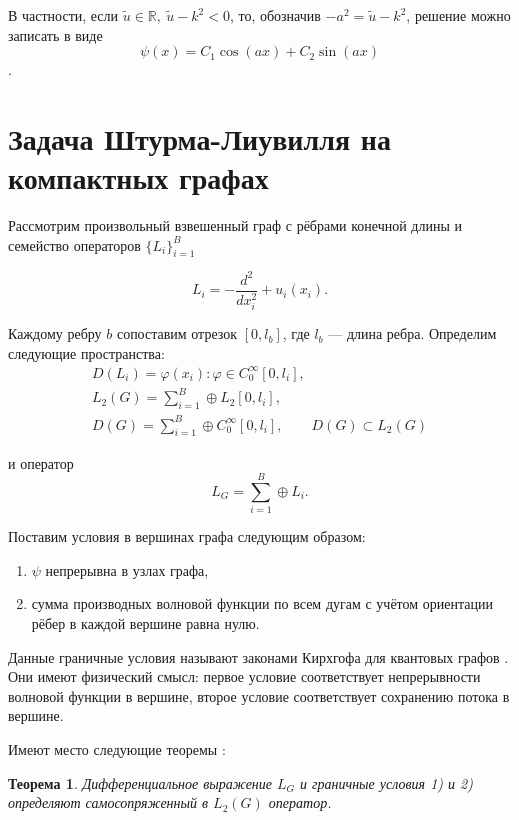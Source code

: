 \documentclass[a4 paper, 12 pt]{extarticle}
\newtheorem{theorem}{Теорема}[section]
\begin{document}
   В частности, если $\tilde{u} \in \mathbb{R}, \ \tilde{u}-k^2<0$, то, обозначив $-a^2=\tilde{u}-k^2$, решение можно записать в виде \[\psi\left(x\right)= C_1 \cos\left(ax\right)+ C_2 \sin\left(ax\right)\].
   
   \section{Задача Штурма-Лиувилля на компактных графах}

   Рассмотрим произвольный взвешенный граф с рёбрами конечной длины и семейство операторов $\{L_i\}_{i=1}^B$

   \begin{equation}\label{LOp}
   L_i = -\frac{d^2}{dx_i^2} + u_i(x_i).
   \end{equation}

   Каждому ребру $b$ сопоставим отрезок $[0, l_b]$, где $l_b$ --- длина ребра.
   Определим следующие пространства:
   \begin{gather*}
   D(L_i)={\varphi(x_i):\varphi\in C_0^\infty[0,l_i]},\\
   L_2(G)=\sum_{i=1}^{B}\oplus L_2[0, l_i],\\
   D(G)=\sum_{i=1}^{B}\oplus C_0^\infty[0,l_i],\qquad D(G)\subset L_2(G)
  \end{gather*}

  и оператор
  \begin{equation}\label{LG}
  L_G=\sum_{i=1}^{B}\oplus L_i.
  \end{equation}

  Поставим условия в вершинах графа следующим образом:

  \begin{enumerate}\label{Kirchoff}
	\item $\psi$ непрерывна в узлах графа,
	\item сумма производных волновой функции по всем дугам с учётом ориентации рёбер в каждой вершине равна нулю.
  \end{enumerate}

  Данные граничные условия называют законами Кирхгофа для квантовых графов \cite{KirchhoffRule}. Они имеют физический смысл: первое условие соответствует непрерывности волновой функции в вершине, второе условие соответствует сохранению потока в вершине.

Имеют место следующие теоремы \cite{GerasimenkoPavlov}:

   \begin{theorem}
	Дифференциальное выражение $L_G$ и граничные условия 1) и 2)
	определяют самосопряженный в $L_2(G)$ оператор.
   \end{theorem}
\end{document}
